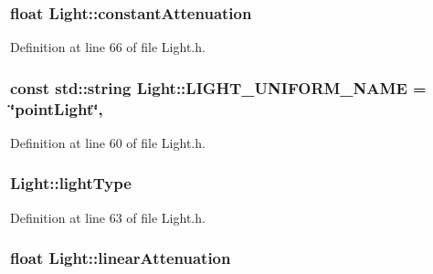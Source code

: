\subsubsection[{constant\+Attenuation}]{\setlength{\rightskip}{0pt plus 5cm}float Light\+::constant\+Attenuation\hspace{0.3cm}{\ttfamily [private]}}\label{class_light_afef6c00a21aa16dc6cc7a7fb1639d2fa}


Definition at line 66 of file Light.\+h.

\hypertarget{class_light_ab2d40f6c364cf728d03a90ff885e37cb}{}
\subsubsection[{L\+I\+G\+H\+T\+\_\+\+U\+N\+I\+F\+O\+R\+M\+\_\+\+N\+A\+M\+E}]{\setlength{\rightskip}{0pt plus 5cm}const std\+::string Light\+::\+L\+I\+G\+H\+T\+\_\+\+U\+N\+I\+F\+O\+R\+M\+\_\+\+N\+A\+M\+E = \char`\"{}point\+Light\char`\"{}\hspace{0.3cm}{\ttfamily [static]}, {\ttfamily [private]}}\label{class_light_ab2d40f6c364cf728d03a90ff885e37cb}


Definition at line 60 of file Light.\+h.

\hypertarget{class_light_ab0c279c927973443f7b52fc924b489aa}{}
\subsubsection[{light\+Type}]{ Light\+::light\+Type\hspace{0.3cm}{\ttfamily [private]}}\label{class_light_ab0c279c927973443f7b52fc924b489aa}


Definition at line 63 of file Light.\+h.

\hypertarget{class_light_afcb2da592197efae015ae16c1c5bfceb}{}
\subsubsection[{linear\+Attenuation}]{\setlength{\rightskip}{0pt plus 5cm}float Light\+::linear\+Attenuation\hspace{0.3cm}{\ttfamily [private]}}\label{class_light_afcb2da592197efae015ae16c1c5bfceb}


